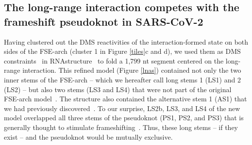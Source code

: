 \documentclass[main.tex]{subfiles}
\begin{document}
\subsection{The long-range interaction competes with the frameshift pseudoknot in SARS-CoV-2}

Having clustered out the DMS reactivities of the interaction-formed state on both sides of the FSE-arch (cluster 1 in Figure \ref{tiles}c and d), we used them as DMS constraints~\cite{Cordero2012} in RNAstructure~\cite{Mathews2004a} to fold a 1,799 nt segment centered on the long-range interaction.
This refined model (Figure \ref{lnas}) contained not only the two inner stems of the FSE-arch -- which we hereafter call long stems 1 (LS1) and 2 (LS2) -- but also two stems (LS3 and LS4) that were not part of the original FSE-arch model~\cite{Ziv2020}.
The structure also contained the alternative stem 1 (AS1) that we had previously discovered~\cite{Lan2022}.
To our surprise, LS2b, LS3, and LS4 of the new model overlapped all three stems of the pseudoknot (PS1, PS2, and PS3) that is generally thought to stimulate frameshifting~\cite{Kelly2020,KZhang2021,Jones2022}.
Thus, these long stems -- if they exist -- and the pseudoknot would be mutually exclusive.
\end{document}
